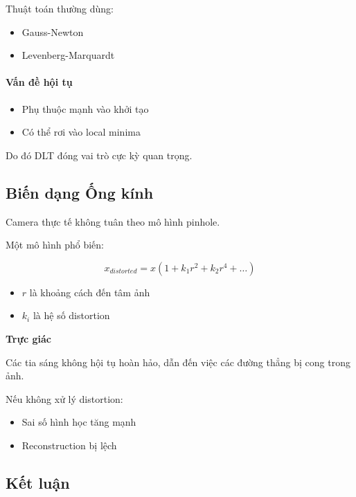 Thuật toán thường dùng:
\begin{itemize}
	\item Gauss-Newton
	\item Levenberg-Marquardt
\end{itemize}

\paragraph{Vấn đề hội tụ}

\begin{itemize}
	\item Phụ thuộc mạnh vào khởi tạo
	\item Có thể rơi vào local minima
\end{itemize}

Do đó DLT đóng vai trò cực kỳ quan trọng.

\subsection{Biến dạng Ống kính}
\label{subsec:distortion}

Camera thực tế không tuân theo mô hình pinhole.

Một mô hình phổ biến:

\[
x_{distorted} = x (1 + k_1 r^2 + k_2 r^4 + \dots)
\]

\begin{itemize}
	\item $r$ là khoảng cách đến tâm ảnh
	\item $k_i$ là hệ số distortion
\end{itemize}

\begin{mdframed}[style=infobox]
	\textbf{Trực giác}
	
	Các tia sáng không hội tụ hoàn hảo, dẫn đến việc các đường thẳng bị cong trong ảnh.
\end{mdframed}

Nếu không xử lý distortion:
\begin{itemize}
	\item Sai số hình học tăng mạnh
	\item Reconstruction bị lệch
\end{itemize}

\subsection*{Kết luận}
\label{subsec:calibration_conclusion}

